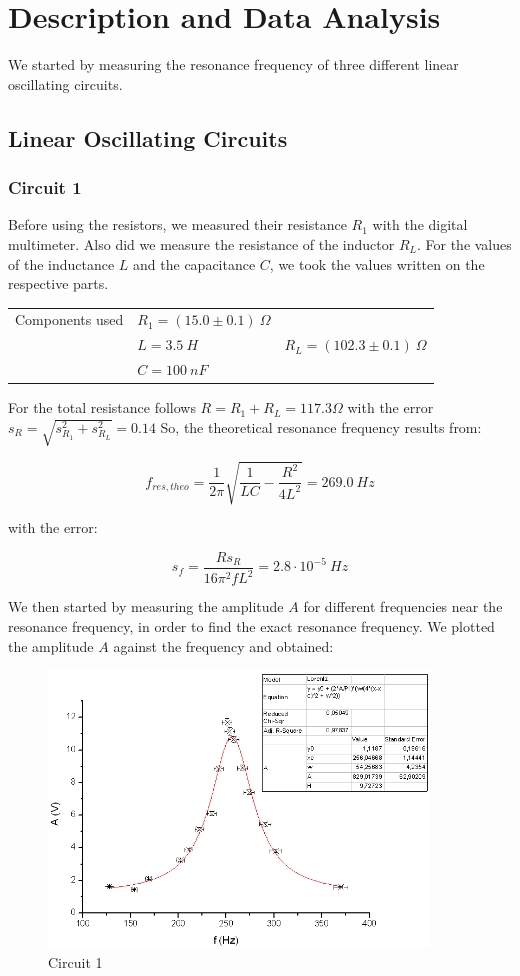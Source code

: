 \clearpage
\section{Description and Data Analysis}

We started by measuring the resonance frequency of three different linear oscillating circuits.

\subsection{Linear Oscillating Circuits}

\subsubsection{Circuit 1}

Before using the resistors, we measured their resistance $R_1$ with the digital multimeter. Also did we measure the resistance of the inductor $R_L$. For the values of the inductance $L$ and the capacitance $C$, we took the values written on the respective parts.

\begin{tabular}{l l l}
Components used & $R_1 = (15.0 \pm 0.1)\ \Omega$ & \\
 & $L=3.5\ H$ & $R_L = (102.3 \pm 0.1)\ \Omega$\\
 & $C=100\ nF$ & \\
\end{tabular}

For the total resistance follows $R = R_1 + R_L = 117.3 \Omega$ with the error $s_R = \sqrt{s_{R_1}^2 + s_{R_L}^2} = 0.14$ 
So, the theoretical resonance frequency results from:

$$f_{res,theo} = \frac{1}{2\pi}\sqrt{\frac{1}{LC}-\frac{R^2}{4L^2}} = 269.0\ Hz$$

with the error:

$$s_f = \frac{Rs_R}{16\pi^2fL^2} = 2.8\cdot 10^{-5}\ Hz$$

We then started by measuring the amplitude $A$ for different frequencies near the resonance frequency, in order to find the exact resonance frequency. We plotted the amplitude $A$ against the frequency and obtained:

\begin{figure}[H]
\centering \includegraphics[width=0.9\textwidth]{Bilder/1a.png}
\caption{Circuit 1}
\end{figure}

